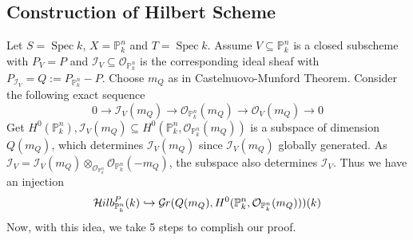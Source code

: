 \documentclass{ctexart}
\newcommand{\spec}{\operatorname{Spec}}
\newcommand{\grassmanmianfunctor}[2]{\mathcal{G}\kern -.5pt r(#1, #2)}
\newcommand{\hilbertfunctor}{\mathcal{H}\kern -.5pt ilb}
\begin{document}
\subsection{Construction of Hilbert Scheme}
Let $S= \spec k$, $X = \mathbb{P}_{k}^{n}$ and $T = \spec k$.
Assume $V \subseteq \mathbb{P}_{k}^{n}$ is a closed subscheme with $P_{V} = P$ and $\mathcal{I}_{V} \subseteq \mathcal{O}_{\mathbb{P}_{k}^{n}}$ is the corresponding ideal sheaf with $P_{\mathcal{I}_{V}} = Q := P_{\mathbb{P}_{k}^{n}} - P$.
Choose $m_{Q}$ as in Castelnuovo-Munford Theorem.
Consider the following exact sequence
\begin{equation*}
    0 \longrightarrow \mathcal{I}_{V}(m_{Q}) \longrightarrow \mathcal{O}_{\mathbb{P}_{k}^{n}}(m_{Q}) \longrightarrow \mathcal{O}_{V}(m_{Q}) \longrightarrow 0
\end{equation*}
Get $H^{0}(\mathbb{P}_{k}^{n}), \mathcal{I}_{V}(m_{Q}) \subseteq H^{0}(\mathbb{P}_{k}^{n}, \mathcal{O}_{\mathbb{P}_{k}^{n}}(m_{Q}))$ is a subspace of dimension $Q(m_{Q})$,
which determines $\mathcal{I}_{V}(m_{Q})$ since $\mathcal{I}_{V}(m_{Q})$ globally generated.
As $\mathcal{I}_{V} = \mathcal{I}_{V}(m_{Q}) \otimes_{\mathcal{O}_{\mathbb{P}_{k}^{n}}} \mathcal{O}_{\mathbb{P}_{k}^{n}}(-m_{Q})$, the subspace also determines $\mathcal{I}_{V}$.
Thus we have an injection
\begin{equation*}
    \hilbertfunctor_{\mathbb{P}_{k}^{n}}^{P}(k) \hookrightarrow \grassmanmianfunctor{Q(m_{Q})}{H^{0}(\mathbb{P}_{k}^{n}, \mathcal{O}_{\mathbb{P}_{k}^{n}}(m_{Q}))}(k)
\end{equation*}
Now, with this idea, we take 5 steps to complish our proof.
\end{document}
